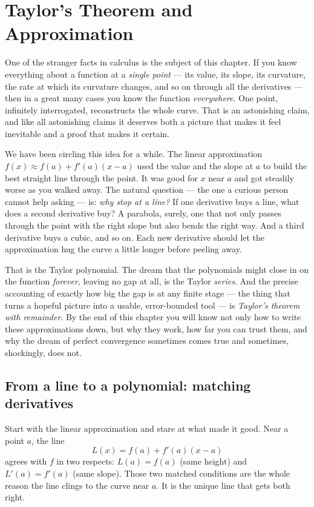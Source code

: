 \chapter{Taylor's Theorem and Approximation}

One of the stranger facts in calculus is the subject of this chapter. If you know
everything about a function at a
\emph{single point} --- its value, its slope, its curvature, the rate at which its
curvature changes, and so on through all the derivatives --- then in a great many
cases you know the function \emph{everywhere}. One point, infinitely interrogated,
reconstructs the whole curve. That is an astonishing claim, and like all astonishing
claims it deserves both a picture that makes it feel inevitable and a proof that
makes it certain.

We have been circling this idea for a while. The linear approximation
$f(x) \approx f(a) + f'(a)(x-a)$ used the value and the slope at $a$ to build the
best straight line through the point. It was good for $x$ near $a$ and got steadily
worse as you walked away. The natural question --- the one a curious person cannot
help asking --- is: \emph{why stop at a line?} If one derivative buys a line, what
does a second derivative buy? A parabola, surely, one that not only passes through
the point with the right slope but also bends the right way. And a third derivative
buys a cubic, and so on. Each new derivative should let the approximation hug the
curve a little longer before peeling away.

That is the Taylor polynomial. The dream that the polynomials might close in on the
function \emph{forever}, leaving no gap at all, is the Taylor \emph{series}. And the
precise accounting of exactly how big the gap is at any finite stage --- the thing
that turns a hopeful picture into a usable, error-bounded tool --- is \emph{Taylor's
theorem with remainder}. By the end of this chapter you will know not only how to
write these approximations down, but why they work, how far you can trust them, and
why the dream of perfect convergence sometimes comes true and sometimes, shockingly,
does not.

\section{From a line to a polynomial: matching derivatives}

Start with the linear approximation and stare at what made it good. Near a point $a$,
the line
\[
  L(x) = f(a) + f'(a)(x-a)
\]
agrees with $f$ in two respects: $L(a) = f(a)$ (same height) and $L'(a) = f'(a)$
(same slope). Those two matched conditions are the whole reason the line clings to
the curve near $a$. It is the unique line that gets both right.

